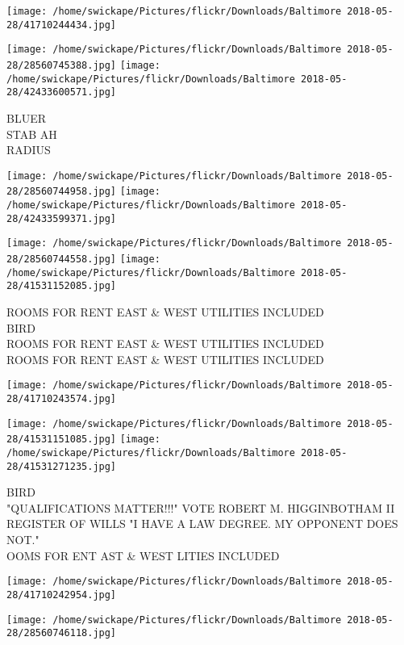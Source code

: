 \documentclass[10pt,letterpaper]{article}
\begin{document}
\texttt{[image: /home/swickape/Pictures/flickr/Downloads/Baltimore 2018-05-28/41710244434.jpg]}

\vspace{0.25in}
\texttt{[image: /home/swickape/Pictures/flickr/Downloads/Baltimore 2018-05-28/28560745388.jpg]}
\texttt{[image: /home/swickape/Pictures/flickr/Downloads/Baltimore 2018-05-28/42433600571.jpg]}

BLUER\\
STAB AH\\
RADIUS\\
\pagebreak

\texttt{[image: /home/swickape/Pictures/flickr/Downloads/Baltimore 2018-05-28/28560744958.jpg]}
\texttt{[image: /home/swickape/Pictures/flickr/Downloads/Baltimore 2018-05-28/42433599371.jpg]}

\texttt{[image: /home/swickape/Pictures/flickr/Downloads/Baltimore 2018-05-28/28560744558.jpg]}
\texttt{[image: /home/swickape/Pictures/flickr/Downloads/Baltimore 2018-05-28/41531152085.jpg]}

ROOMS FOR RENT EAST \& WEST UTILITIES INCLUDED\\
BIRD\\
ROOMS FOR RENT EAST \& WEST UTILITIES INCLUDED\\
ROOMS FOR RENT EAST \& WEST UTILITIES INCLUDED\\
\pagebreak

\texttt{[image: /home/swickape/Pictures/flickr/Downloads/Baltimore 2018-05-28/41710243574.jpg]}

\vspace{0.25in}
\texttt{[image: /home/swickape/Pictures/flickr/Downloads/Baltimore 2018-05-28/41531151085.jpg]}
\texttt{[image: /home/swickape/Pictures/flickr/Downloads/Baltimore 2018-05-28/41531271235.jpg]}

BIRD\\
"QUALIFICATIONS MATTER!!!" VOTE ROBERT M. HIGGINBOTHAM II REGISTER OF WILLS "I HAVE A LAW DEGREE.  MY OPPONENT DOES NOT."\\
OOMS FOR ENT AST \& WEST LITIES INCLUDED\\
\pagebreak

\texttt{[image: /home/swickape/Pictures/flickr/Downloads/Baltimore 2018-05-28/41710242954.jpg]}

\vspace{0.25in}
\texttt{[image: /home/swickape/Pictures/flickr/Downloads/Baltimore 2018-05-28/28560746118.jpg]}
\end{document}
